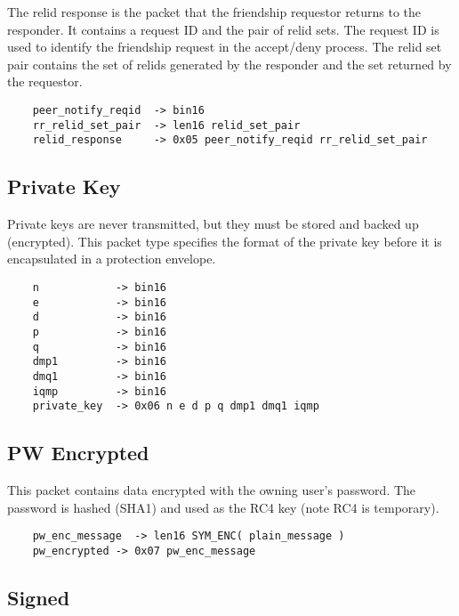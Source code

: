 \documentclass[letterpaper,11pt,oneside]{article}
\begin{document}
The relid response is the packet that the friendship requestor returns to the
responder. It contains a request ID and the pair of relid sets. The request ID
is used to identify the friendship request in the accept/deny process. The
relid set pair contains the set of relids generated by the responder and the
set returned by the requestor.

\vspace{10pt}
\begin{verbatim}
    peer_notify_reqid  -> bin16
    rr_relid_set_pair  -> len16 relid_set_pair
    relid_response     -> 0x05 peer_notify_reqid rr_relid_set_pair
\end{verbatim}
\vspace{10pt}

\subsection{Private Key}

Private keys are never transmitted, but they must be stored and backed up
(encrypted). This packet type specifies the format of the private key before it
is encapsulated in a protection envelope.

\vspace{10pt}
\begin{verbatim}
    n            -> bin16
    e            -> bin16
    d            -> bin16
    p            -> bin16
    q            -> bin16
    dmp1         -> bin16
    dmq1         -> bin16
    iqmp         -> bin16
    private_key  -> 0x06 n e d p q dmp1 dmq1 iqmp
\end{verbatim}
\vspace{10pt}

\subsection{PW Encrypted}

This packet contains data encrypted with the owning user's password. The
password is hashed (SHA1) and used as the RC4 key (note RC4 is temporary).

\vspace{10pt}
\begin{verbatim}
    pw_enc_message  -> len16 SYM_ENC( plain_message ) 
    pw_encrypted -> 0x07 pw_enc_message
\end{verbatim}
\vspace{10pt}

\subsection{Signed}
\label{signed-packet}
\end{document}
